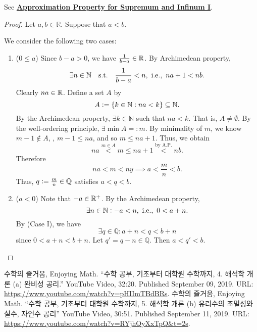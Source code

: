 \documentclass[11pt,openany]{article}
\begin{document}
\begin{remark*}
	See \hyperlink{pro1}{\bf Approximation Property for Supremum and Infinum I}.
\end{remark*}
\vfill
{}
\begin{proof}
Let $a,b\in\mathbb{R}$. Suppose that $a<b$. 
\begin{center}
\end{center} We consider the following two cases: 
\begin{enumerate}
	\item ($0\leq a$) Since $b-a>0$, we have $\frac{1}{b-a}\in\mathbb{R}$. By Archimedean property, \[
	\exists n\in\mathbb{N}\quad \text{s.t.}\quad \frac{1}{b-a}<n,\ \text{\ie},\ na+1< nb.
	\] Clearly $na\in\mathbb{R}$. Define a set $A$ by \[
	A:=\set{k\in\mathbb{N}:na<k}\subseteq\mathbb{N}.
	\] By the Archimedean property, $\exists k\in\mathbb{N}$ such that $na<k$. That is, $A\neq\emptyset$. By the well-ordering principle, $\exists\min A=:m$. By minimality of $m$, we know $m-1\notin A$, \ie, $m-1\leq na$, and so $m\leq na+1$. Thus, we obtain \[
	na\overset{m\in A}{<}m\leq na+1\overset{\text{by A.P.}}{<}nb.
	\] Therefore \[
	na<m<ny\implies a<\frac{m}{n}<b.
	\] Thus, $q:=\frac{m}{n}\in\mathbb{Q}$ satisfies $a<q<b$.
	\item ($a<0$) Note that $-a\in\mathbb{R}^+$. By the Archimedean property, \[
	\exists n\in\mathbb{N}:-a<n,\ \text{\textnormal{i.e.}},\ 0<a+n.
	\] By (Case I), we have \[
	\exists q\in\mathbb{Q}: a+n<q<b+n
	\] since $0<a+n<b+n$. Let $q'=q-n\in\mathbb{Q}$. Then $a<q'<b$.
\end{enumerate}
\end{proof}
\vfill
\begin{thebibliography}{9}
	수학의 즐거움, Enjoying Math. ``수학 공부, 기초부터 대학원 수학까지, 4. 해석학 개론 (a) 완비성 공리.'' YouTube Video, 32:20. Published 
	September 09, 2019. URL: \url{https://www.youtube.com/watch?v=pHIImTBdBRs}.
	수학의 즐거움, Enjoying Math. ``수학 공부, 기초부터 대학원 수학까지, 5. 해석학 개론 (b) 유리수의 조밀성와 실수, 자연수 공리'' YouTube Video, 30:51. Published 
	September 11, 2019. URL: \url{https://www.youtube.com/watch?v=RYjhQyXxTpQ&t=2s}.
\end{thebibliography}
\end{document}
